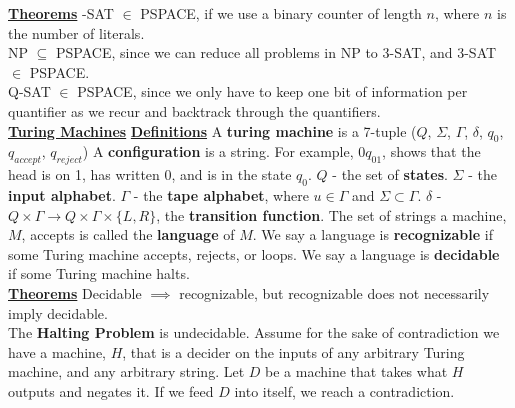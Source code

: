 \documentclass[10pt]{article}
\begin{document}
\begin{multicols*}{3}
\underline{\textbf{Theorems}} -SAT $\in$ PSPACE, if we use a binary counter of length $n$, where $n$ is the number of literals. \newline \\ 
NP $\subseteq$ PSPACE, since we can reduce all problems in NP to 3-SAT, and 3-SAT $\in$ PSPACE. \newline \\
Q-SAT $\in$ PSPACE, since we only have to keep one bit of information per quantifier as we recur and backtrack through the quantifiers. \newline \\
\noindent \Large{\underline{\textbf{Turing Machines}}} \newline
\normalsize
\noindent \underline{\textbf{Definitions}} \newline
A \textbf{turing machine} is a 7-tuple ($Q$, $\Sigma$, $\Gamma$, $\delta$, $q_0$, $q_{accept}$, $q_{reject}$) \newline
A \textbf{configuration} is a string. For example, $0q_01$, shows that the head is on 1, has written 0, and is in the state $q_0$. \newline
$Q$ - the set of \textbf{states}. \newline
$\Sigma$ - the \textbf{input alphabet}. \newline
$\Gamma$ - the \textbf{tape alphabet}, where $u \in \Gamma$ and \indent $\Sigma \subset \Gamma$. \newline
$\delta$ - $Q \times \Gamma \rightarrow Q \times \Gamma \times \{L, R\}$, the \indent \textbf{transition function}. \newline
The set of strings a machine, $M$, accepts is called the \textbf{language} of $M$.
We say a language is \textbf{recognizable} if some Turing machine accepts, rejects, or loops.
We say a language is \textbf{decidable} if some Turing machine halts. \newline \\
\underline{\textbf{Theorems}} \newline
Decidable $\implies$ recognizable, but recognizable does not necessarily imply decidable. \newline \\
The \textbf{Halting Problem} is undecidable. \newline
Assume for the sake of contradiction we have a machine, $H$, that is a decider on the inputs of any arbitrary Turing machine, and any arbitrary string. Let $D$ be a machine that takes what $H$ outputs and negates it. If we feed $D$ into itself, we reach a contradiction. \newline \\

\end{multicols*}
\end{document}
